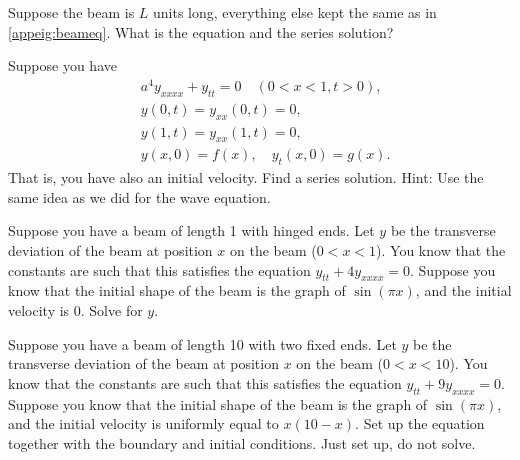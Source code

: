 \begin{exercise}
Suppose the beam is $L$ units long, everything else kept the same
as in \eqref{appeig:beameq}.  What is the equation and the series
solution?
\end{exercise}

\begin{exercise}
Suppose you have 
\begin{equation*}
\begin{aligned}
& a^4 y_{xxxx} + y_{tt} = 0 \quad (0 < x < 1, t > 0) , \\
& y(0,t) = y_{xx}(0,t) = 0,\\
& y(1,t) = y_{xx}(1,t) = 0 ,\\
& y(x,0) = f(x), \quad y_{t}(x,0) = g(x) .
\end{aligned}
\end{equation*}
That is, you have also an initial velocity.  Find a series solution.  Hint:
Use the same idea as we did for the wave equation.
\end{exercise}

\setcounter{exercise}{100}

\begin{exercise}
Suppose you have a beam of length 1 with hinged ends.  Let $y$ be the
transverse deviation of the beam at position $x$ on the beam ($0 < x < 1$).
You know that the
constants are such that this satisfies the equation $y_{tt} + 4 y_{xxxx} =
0$.   Suppose you know that the initial shape of the beam is the graph of
$\sin (\pi x)$, and the initial velocity is 0.  Solve for $y$.
\end{exercise}

\begin{exercise}
Suppose you have a beam of length 10 with two fixed ends.  Let $y$ be the
transverse deviation of the beam at position $x$ on the beam ($0 < x < 10$).
You know that the
constants are such that this satisfies the equation $y_{tt} + 9 y_{xxxx} =
0$.   Suppose you know that the initial shape of the beam is the graph of
$\sin(\pi x)$, and the initial velocity is uniformly equal to $x(10-x)$.
Set up the equation together with the
boundary and initial conditions.  Just set up, do not solve.
\end{exercise}


